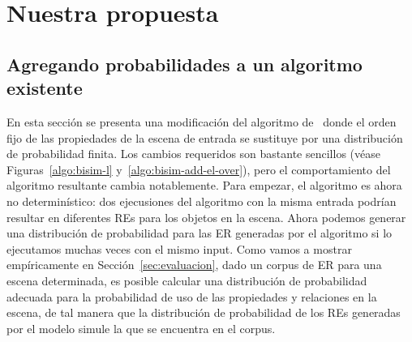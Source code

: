 \chapter{Nuestra propuesta}
\label{sec:algoritmo}
\section{Agregando probabilidades a un algoritmo existente}



En esta secci\'on se presenta una modificaci\'on del algoritmo
de~\cite{arec2:2008:Areces} donde el orden fijo de las propiedades de
la escena de entrada se sustituye por una distribuci\'on de probabilidad finita. Los
cambios requeridos son bastante sencillos (v\'ease
Figuras~\ref{algo:bisim-l} y~\ref{algo:bisim-add-el-over}), pero el comportamiento del algoritmo 
resultante cambia notablemente. Para empezar, el
algoritmo es ahora no determin\'istico: dos ejecusiones del algoritmo con la
misma entrada podr\'{i}an resultar en diferentes REs para los objetos en la escena.
Ahora podemos generar una distribuci\'on de probabilidad
para las ER generadas por el algoritmo si lo ejecutamos muchas veces con
el mismo input. Como vamos a mostrar emp\'{i}ricamente en
Secci\'on~\ref{sec:evaluacion}, dado un corpus de ER para una escena determinada,
es posible calcular una distribuci\'on de probabilidad adecuada para la
probabilidad de uso de las propiedades y relaciones en la escena, de tal manera que
la distribuci\'on de probabilidad de los REs generadas por el modelo
simule la que se encuentra en el corpus.

